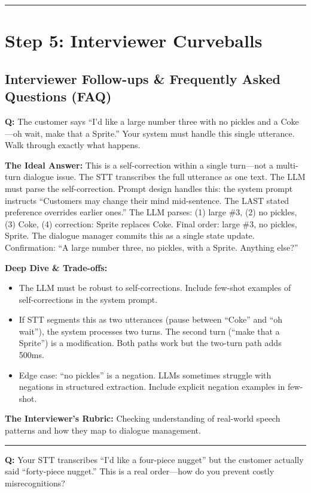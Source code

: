 \bigskip\hrule\bigskip

\section*{Step 5: Interviewer Curveballs}

\subsection*{Interviewer Follow-ups \& Frequently Asked Questions (FAQ)}

\textbf{Q:} The customer says ``I'd like a large number three with no pickles and a Coke---oh wait, make that a Sprite.'' Your system must handle this single utterance. Walk through exactly what happens.

\textbf{The Ideal Answer:} This is a self-correction within a single turn---not a multi-turn dialogue issue. The STT transcribes the full utterance as one text. The LLM must parse the self-correction. Prompt design handles this: the system prompt instructs ``Customers may change their mind mid-sentence. The LAST stated preference overrides earlier ones.'' The LLM parses: (1) large \#3, (2) no pickles, (3) Coke, (4) correction: Sprite replaces Coke. Final order: large \#3, no pickles, Sprite. The dialogue manager commits this as a single state update. Confirmation: ``A large number three, no pickles, with a Sprite. Anything else?''

\textbf{Deep Dive \& Trade-offs:}
\begin{itemize}
  \item The LLM must be robust to self-corrections. Include few-shot examples of self-corrections in the system prompt.
  \item If STT segments this as two utterances (pause between ``Coke'' and ``oh wait''), the system processes two turns. The second turn (``make that a Sprite'') is a modification. Both paths work but the two-turn path adds 500ms.
  \item Edge case: ``no pickles'' is a negation. LLMs sometimes struggle with negations in structured extraction. Include explicit negation examples in few-shot.
\end{itemize}

\textbf{The Interviewer's Rubric:} Checking understanding of real-world speech patterns and how they map to dialogue management.

\bigskip\hrule\bigskip

\textbf{Q:} Your STT transcribes ``I'd like a four-piece nugget'' but the customer actually said ``forty-piece nugget.'' This is a real order---how do you prevent costly misrecognitions?

